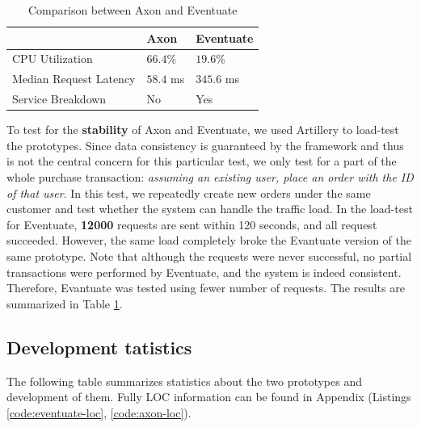 \begin{table}[H]
    \begin{center}
        \begin{tabular}{ | m{2cm} | l | l | }

            \hline
            & Axon & Eventuate \\

            \hline
            CPU Utilization &
            $66.4\%$ &
            $19.6\%$ \\

            \hline
            Median Request Latency &
            $58.4$ ms &
            $345.6$ ms \\

            \hline
            Service Breakdown & No & Yes \\

            \hline

        \end{tabular}
    \end{center}
    \caption{Comparison between Axon and Eventuate}
    \label{table:load}
\end{table}

To test for the \textbf{stability} of Axon and Eventuate, we used Artillery to load-test the prototypes. Since data consistency is guaranteed by the framework and thus is not the central concern for this particular test, we only test for a part of the whole purchase transaction: \textit{assuming an existing user, place an order with the ID of that user}. In this test, we repeatedly create new orders under the same customer and test whether the system can handle the traffic load. In the load-test for Eventuate, \textbf{12000} requests are sent within 120 seconds, and all request succeeded. However, the same load completely broke the Evantuate version of the same prototype. Note that although the requests were never successful, no partial transactions were performed by Eventuate, and the system is indeed consistent. Therefore, Evantuate was tested using fewer number of requests. The results are summarized in Table \ref{table:load}.

\subsection{Development tatistics}

The following table summarizes statistics about the two prototypes and development of them. Fully LOC information can be found in Appendix (Listings \ref{code:eventuate-loc}, \ref{code:axon-loc}).

